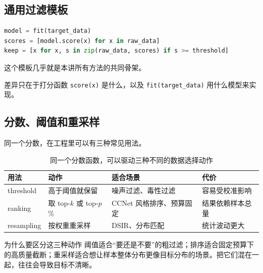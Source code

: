 \documentclass[a4paper]{article}
\begin{document}
\subsection{通用过滤模板}

\begin{lstlisting}[language=Python, caption={一个极简的过滤模板}]
model = fit(target_data)
scores = [model.score(x) for x in raw_data]
keep = [x for x, s in zip(raw_data, scores) if s >= threshold]
\end{lstlisting}

这个模板几乎就是本讲所有方法的共同骨架。

差异只在于打分函数 \texttt{score(x)} 是什么，以及 \texttt{fit(target\_data)} 用什么模型来实现。

\subsection{分数、阈值和重采样}

同一个分数，在工程里可以有三种常见用法。

\begin{table}[H]
\centering
\small
\renewcommand{\arraystretch}{1.15}
\begin{tabular}{p{2.2cm}p{4.3cm}p{4.1cm}p{3.1cm}}
\toprule
\textbf{用法} & \textbf{动作} & \textbf{适合场景} & \textbf{代价} \\
\midrule
threshold & 高于阈值就保留 & 噪声过滤、毒性过滤 & 容易受校准影响 \\
ranking & 取 top-$k$ 或 top-$p$\% & CCNet 风格排序、预算固定 & 结果依赖样本总量 \\
resampling & 按权重重采样 & DSIR、分布匹配 & 统计波动更大 \\
\bottomrule
\end{tabular}
\caption{同一个分数函数，可以驱动三种不同的数据选择动作}
\end{table}

\begin{importantbox}{为什么要区分这三种动作}
阈值适合“要还是不要”的粗过滤；排序适合固定预算下的高质量截断；重采样适合想让样本整体分布更像目标分布的场景。把它们混在一起，往往会导致目标不清晰。
\end{importantbox}
\end{document}
